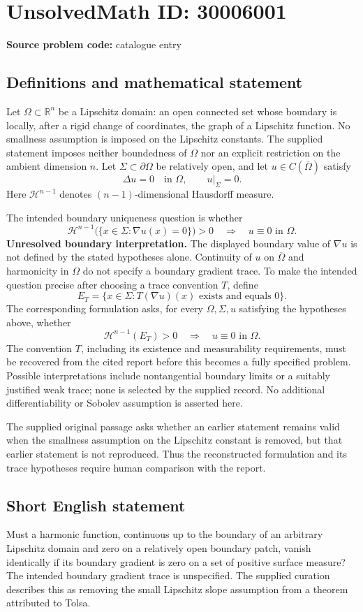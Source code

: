 \documentclass[11pt]{article}
\newcommand{\R}{\mathbb{R}}
\begin{document}
\section*{UnsolvedMath ID: 30006001}
\textbf{Source problem code:} catalogue entry
\subsection{Definitions and mathematical statement}
Let \(\Omega\subset\R^n\) be a Lipschitz domain: an open connected set whose boundary is locally, after a rigid change of coordinates, the graph of a Lipschitz function. No smallness assumption is imposed on the Lipschitz constants. The supplied statement imposes neither boundedness of \(\Omega\) nor an explicit restriction on the ambient dimension \(n\). Let \(\Sigma\subset\partial\Omega\) be relatively open, and let \(u\in C(\overline\Omega)\) satisfy
\[
\Delta u=0\quad\text{in }\Omega,
\qquad u|_{\Sigma}=0.
\]
Here \(\mathcal H^{n-1}\) denotes \((n-1)\)-dimensional Hausdorff measure.

The intended boundary uniqueness question is whether
\[
\mathcal H^{n-1}\bigl(\{x\in\Sigma:\nabla u(x)=0\}\bigr)>0
\quad\Longrightarrow\quad
u\equiv0\text{ in }\Omega.
\]
\textbf{Unresolved boundary interpretation.} The displayed boundary value of \(\nabla u\) is not defined by the stated hypotheses alone. Continuity of \(u\) on \(\overline\Omega\) and harmonicity in \(\Omega\) do not specify a boundary gradient trace. To make the intended question precise after choosing a trace convention \(T\), define
\[
E_T=\{x\in\Sigma:T(\nabla u)(x)\text{ exists and equals }0\}.
\]
The corresponding formulation asks, for every \(\Omega,\Sigma,u\) satisfying the hypotheses above, whether
\[
\mathcal H^{n-1}(E_T)>0
\quad\Longrightarrow\quad
u\equiv0\text{ in }\Omega.
\]
The convention \(T\), including its existence and measurability requirements, must be recovered from the cited report before this becomes a fully specified problem. Possible interpretations include nontangential boundary limits or a suitably justified weak trace; none is selected by the supplied record. No additional differentiability or Sobolev assumption is asserted here.

The supplied original passage asks whether an earlier statement remains valid when the smallness assumption on the Lipschitz constant is removed, but that earlier statement is not reproduced. Thus the reconstructed formulation and its trace hypotheses require human comparison with the report.
\subsection{Short English statement}
Must a harmonic function, continuous up to the boundary of an arbitrary Lipschitz domain and zero on a relatively open boundary patch, vanish identically if its boundary gradient is zero on a set of positive surface measure? The intended boundary gradient trace is unspecified. The supplied curation describes this as removing the small Lipschitz slope assumption from a theorem attributed to Tolsa.
\end{document}
